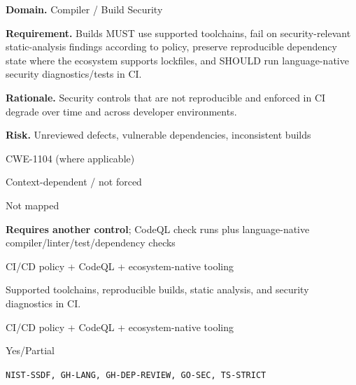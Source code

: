 \documentclass[10pt,letterpaper]{article}
\newcommand{\prioritybadge}[2]{\tcbox[on line,boxrule=0pt,arc=1.2mm,boxsep=0.7mm,left=1mm,right=1mm,top=0.4mm,bottom=0.4mm,colback=#2!12,coltext=#2]{\scriptsize\bfseries #1}}
\begin{document}
\begin{rulebox}[title={\texttt{SCS-ALL-BUILD-001} \hfill \prioritybadge{High Priority}{High}}]
\textbf{Domain.} Compiler / Build Security

\textbf{Requirement.} Builds MUST use supported toolchains, fail on security-relevant static-analysis findings according to policy, preserve reproducible dependency state where the ecosystem supports lockfiles, and SHOULD run language-native security diagnostics/tests in CI.

\textbf{Rationale.} Security controls that are not reproducible and enforced in CI degrade over time and across developer environments.

\textbf{Risk.} Unreviewed defects, vulnerable dependencies, inconsistent builds

\begin{description}[leftmargin=2.65cm,labelwidth=2.3cm,style=nextline,itemsep=1pt,topsep=3pt]
  \item[CWE] CWE-1104 (where applicable)
  \item[OWASP] Context-dependent / not forced
  \item[CERT] Not mapped
  \item[CodeQL] \textbf{Requires another control}; CodeQL check runs plus language-native compiler/linter/test/dependency checks
  \item[Enforcement] CI/CD policy + CodeQL + ecosystem-native tooling
  \item[Prevention] Supported toolchains, reproducible builds, static analysis, and security diagnostics in CI.
  \item[Verification] CI/CD policy + CodeQL + ecosystem-native tooling
  \item[Automation] Yes/Partial
  \item[Sources] \texttt{NIST-SSDF, GH-LANG, GH-DEP-REVIEW, GO-SEC, TS-STRICT}
\end{description}
\end{rulebox}
\end{document}
